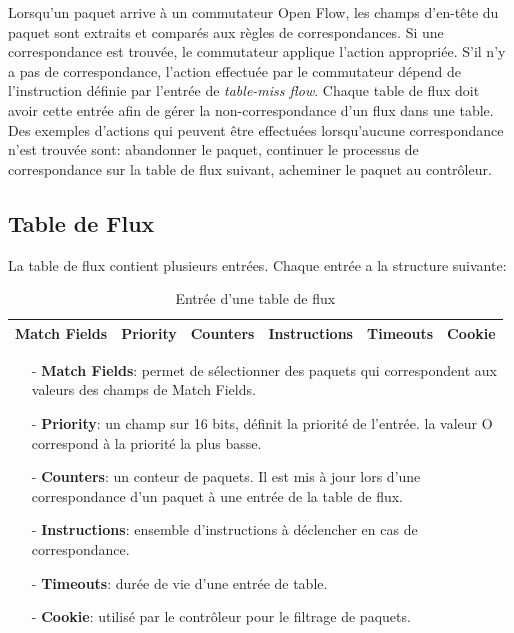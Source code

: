 Lorsqu’un paquet arrive à un commutateur Open Flow, les champs d’en-tête du paquet sont extraits et comparés aux règles de correspondances. Si une correspondance est trouvée, le commutateur applique l’action appropriée. S’il n’y a pas de correspondance, l’action effectuée par le commutateur dépend de l’instruction définie par l’entrée de \textit{ table-miss flow}. Chaque table de flux doit avoir cette entrée afin de gérer la non-correspondance d’un flux dans une table. Des exemples d’actions qui peuvent être effectuées lorsqu'aucune correspondance n’est trouvée sont: abandonner le paquet, continuer le processus de correspondance sur la table de flux suivant, acheminer le paquet au contrôleur. 

\subsection{Table de Flux}
La table de flux contient plusieurs entrées. Chaque entrée a la structure suivante:\\
\begin{table}[h]
\begin{center}
\begin{tabular}{ | c | c | c | c | c | c |}
\hline
\rowcolor[rgb]{0.85,0.85,0.85}
Match Fields & Priority & Counters & Instructions & Timeouts & Cookie\\
\hline
\end{tabular}
\caption{Entrée d'une table de flux}
\end{center}
\end{table}
\begin{itemize}

\item[-]\textbf{Match Fields}: permet de sélectionner des paquets qui correspondent aux valeurs des champs de Match Fields.
\item[-]\textbf{Priority}: un champ sur 16 bits, définit la priorité de l'entrée. la valeur O correspond à la priorité la plus basse.
\item[-]\textbf{Counters}: un conteur de paquets. Il est mis à jour lors d'une correspondance d'un paquet à une entrée de la table de flux. 
\item[-]\textbf{Instructions}: ensemble d'instructions à déclencher en cas de correspondance. 
\item[-]\textbf{Timeouts}: durée de vie d'une entrée de table.
\item[-]\textbf{Cookie}: utilisé par le contrôleur pour le filtrage de paquets.\\
\end{itemize}

